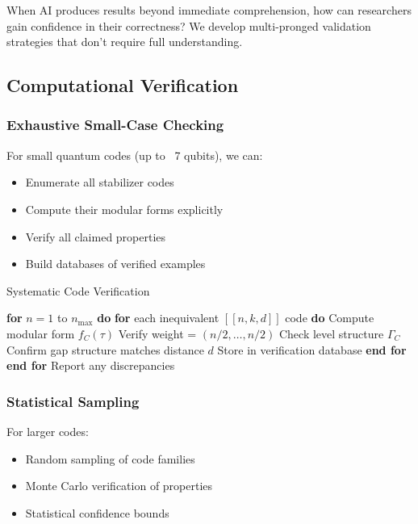 \documentclass[11pt,a4paper]{article}
\begin{document}
When AI produces results beyond immediate comprehension, how can researchers gain confidence in their correctness? We develop multi-pronged validation strategies that don't require full understanding.

\subsection{Computational Verification}

\subsubsection{Exhaustive Small-Case Checking}
For small quantum codes (up to ~7 qubits), we can:
\begin{itemize}
\item Enumerate all stabilizer codes
\item Compute their modular forms explicitly
\item Verify all claimed properties
\item Build databases of verified examples
\end{itemize}

\begin{algorithm}
\caption{Systematic Code Verification}
\begin{algorithmic}[1]
\STATE \textbf{for} $n = 1$ to $n_{\max}$ \textbf{do}
\STATE \quad \textbf{for} each inequivalent $[[n,k,d]]$ code \textbf{do}
\STATE \quad \quad Compute modular form $f_C(\tau)$
\STATE \quad \quad Verify weight = $(n/2, \ldots, n/2)$
\STATE \quad \quad Check level structure $\Gamma_C$
\STATE \quad \quad Confirm gap structure matches distance $d$
\STATE \quad \quad Store in verification database
\STATE \quad \textbf{end for}
\STATE \textbf{end for}
\STATE Report any discrepancies
\end{algorithmic}
\end{algorithm}

\subsubsection{Statistical Sampling}
For larger codes:
\begin{itemize}
\item Random sampling of code families
\item Monte Carlo verification of properties
\item Statistical confidence bounds
\end{itemize}
\end{document}
